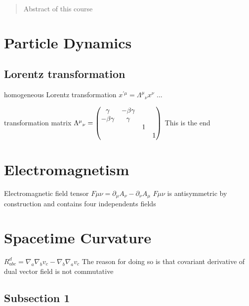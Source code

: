\documentclass[12pt,a4paper]{article}
\begin{document}
\begin{titlepage}
    \maketitle
\end{titlepage}

\tableofcontents

\newpage

\begin{abstract}
\noindent
Abstract of this course
\end{abstract}

\section{Particle Dynamics}
\subsection{Lorentz transformation}
\begin{definition}
    {homogeneous Lorentz transformation}
    {$x^{'\mu} = {\Lambda ^ \mu}_\nu x^\nu$}
    {...}
\end{definition}
\begin{definition}
    {transformation matrix}
    {${\Lambda^\mu}_\nu = \mqty(\dmat{\gamma & -\beta\gamma \\ -\beta\gamma & \gamma,1,1})$}
    {This is the end }
\end{definition}


\section{Electromagnetism}
\begin{definition}
    {Electromagnetic field tensor}
    {$F\mu\nu = \partial_\mu A_\nu - \partial_\nu A_\mu$}
    {$F\mu\nu$ is antisymmetric by construction and contains four independents fields }
\end{definition}

\section{Spacetime Curvature}
    {$R_{abc}^d=\nabla_a\nabla_b v_c-\nabla_b\nabla_a v_c$}
    {The reason for doing so is that covariant derivative of dual vector field is not commutative}
    \subsection{Subsection 1}
\end{document}
